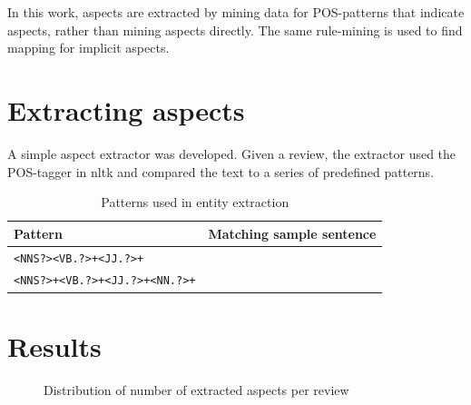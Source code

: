 \documentclass[a4paper,11pt]{kth-mag}
\begin{document}
In this work, aspects are extracted by mining data for POS-patterns that indicate aspects, rather than mining aspects directly. The same rule-mining is used to find mapping for implicit aspects.

\newpage
\section{Extracting aspects}
A simple aspect extractor was developed. Given a review, the extractor used the POS-tagger in nltk\cite{nltk} and compared the text to a series of predefined patterns.
\newcommand{\ExtrPatOne}{\texttt{<NNS?><VB.?>+<JJ.?>+}}
\newcommand{\ExtrPatTwo}{\texttt{<NNS?>+<VB.?>+<JJ.?>+<NN.?>+}}

\begin{table}[t]
  \centering
  \begin{tabular}{| l | l |}
    \hline
    \textbf{Pattern} & \textbf{Matching sample sentence}\\ \hline
    \ExtrPatOne & \emph{}\\
    \ExtrPatTwo & \emph{}\\ \hline
  \end{tabular}
  \caption{Patterns used in entity extraction}
  \label{sample_pos}
\end{table}

\section{Results}





\begin{figure}[h]
  \centering
  \caption{Distribution of number of extracted aspects per review}
  \label{fig:extr_count}
\end{figure}
\end{document}
